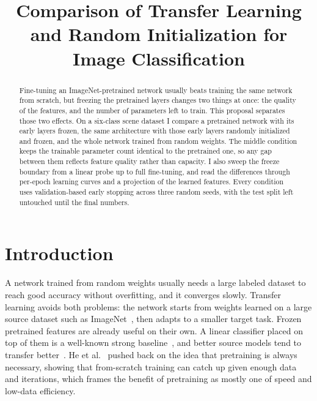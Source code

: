 \documentclass[conference]{IEEEtran}
\begin{document}
\title{Comparison of Transfer Learning and Random Initialization for Image Classification}

\author{
}

\maketitle

\begin{abstract}
Fine-tuning an ImageNet-pretrained network usually beats training the same network from scratch, but freezing the pretrained layers changes two things at once: the quality of the features, and the number of parameters left to train. This proposal separates those two effects. On a six-class scene dataset I compare a pretrained network with its early layers frozen, the same architecture with those early layers randomly initialized and frozen, and the whole network trained from random weights. The middle condition keeps the trainable parameter count identical to the pretrained one, so any gap between them reflects feature quality rather than capacity. I also sweep the freeze boundary from a linear probe up to full fine-tuning, and read the differences through per-epoch learning curves and a projection of the learned features. Every condition uses validation-based early stopping across three random seeds, with the test split left untouched until the final numbers.
\end{abstract}

\section{Introduction}
A network trained from random weights usually needs a large labeled dataset to reach good accuracy without overfitting, and it converges slowly. Transfer learning avoids both problems: the network starts from weights learned on a large source dataset such as ImageNet~\cite{deng2009imagenet}, then adapts to a smaller target task. Frozen pretrained features are already useful on their own. A linear classifier placed on top of them is a well-known strong baseline~\cite{donahue2014decaf,razavian2014cnn}, and better source models tend to transfer better~\cite{kornblith2019better}. He et al.~\cite{he2019rethinking} pushed back on the idea that pretraining is always necessary, showing that from-scratch training can catch up given enough data and iterations, which frames the benefit of pretraining as mostly one of speed and low-data efficiency.
\end{document}

